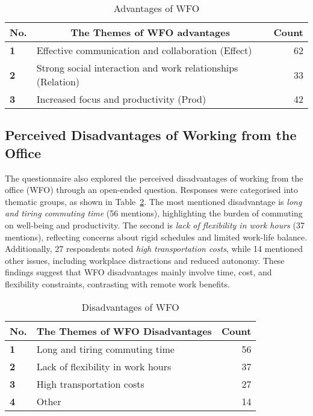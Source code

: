 \documentclass[a4paper, conference]{IEEEtran}
\begin{document}
\begin{table}[ht]
	\caption{Advantages of WFO}
	\label{Advanatage of WFO}
	\begin{tabular}{|p{}|p{}|r|}
		\hline
		\multicolumn{1}{|c|}{\textbf{No.}} & \multicolumn{1}{c|}{\textbf{The Themes of WFO advantages}} & \multicolumn{1}{c|}{\textbf{Count}} \\ \hline
		\textbf{1}             & Effective communication and collaboration (Effect)     & 62 %
		\\ \hline
		\textbf{2}             & Strong social interaction and work relationships (Relation)& 33 %
		\\ \hline
		\textbf{3}             & Increased focus and productivity (Prod)        & 42 %
		\\ \hline
	\end{tabular}
\end{table}

\subsection{Perceived Disadvantages of Working from the Office}
\label{sec:disadvantage-wfo}

The questionnaire also explored the perceived disadvantages of working from the office (WFO) through an open-ended question. Responses were categorised into thematic groups, as shown in Table~\ref{Disadvantages of WFO}. The most mentioned disadvantage is \textit{long and tiring commuting time} (56 mentions), highlighting the burden of commuting on well-being and productivity. The second is \textit{lack of flexibility in work hours} (37 mentions), reflecting concerns about rigid schedules and limited work-life balance. Additionally, 27 respondents noted \textit{high transportation costs}, while 14 mentioned other issues, including workplace distractions and reduced autonomy. These findings suggest that WFO disadvantages mainly involve time, cost, and flexibility constraints, contrasting with remote work benefits.

\begin{table}[ht]
	\caption{Disadvantages of WFO}
	\label{Disadvantages of WFO}
	\begin{tabular}{|p{}|p{}|r|}
		\hline
		\multicolumn{1}{|c|}{\textbf{No.}} & \multicolumn{1}{c|}{\textbf{The Themes of WFO Disadvantages}} & \multicolumn{1}{c|}{\textbf{Count}} \\ \hline
		\textbf{1}             & Long and tiring commuting time            & 56 %
		\\ \hline
		\textbf{2}             & Lack of flexibility in work hours          & 37 %
		\\ \hline
		\textbf{3}             & High transportation costs              & 27 %
		\\ \hline
		\textbf{4}             & Other          & 14
		\\ \hline
	\end{tabular}
\end{table}
\end{document}
